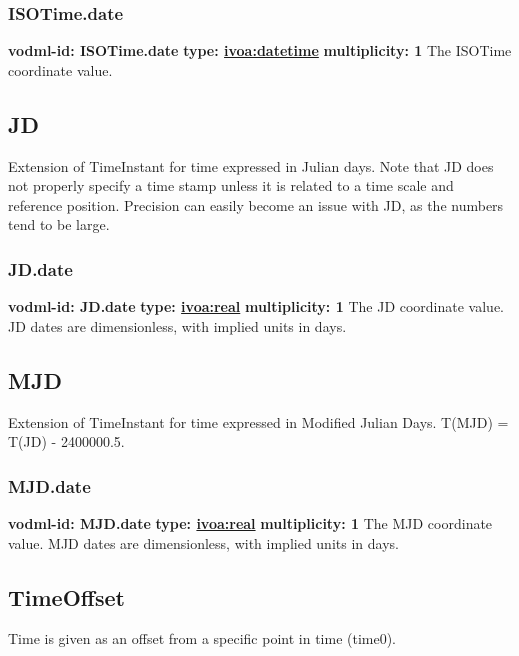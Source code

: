     \subsubsection{ISOTime.date}
      \textbf{vodml-id: ISOTime.date} \newline
      \textbf{type: \hyperref[sect:ivoa]{ivoa:datetime}} \newline
      \textbf{multiplicity: 1} \newline 
      The ISOTime coordinate value.

  \subsection{JD}
  \label{sect:JD}
    Extension of TimeInstant for time expressed in Julian days. Note that JD does not properly specify a time stamp unless it is related to a time scale and reference position. Precision can easily become an issue with JD, as the numbers tend to be large.

    \subsubsection{JD.date}
      \textbf{vodml-id: JD.date} \newline
      \textbf{type: \hyperref[sect:ivoa]{ivoa:real}} \newline
      \textbf{multiplicity: 1} \newline 
      The JD coordinate value. JD dates are dimensionless, with implied units in days.

  \subsection{MJD}
  \label{sect:MJD}
    Extension of TimeInstant for time expressed in Modified Julian Days. T(MJD) = T(JD) - 2400000.5.

    \subsubsection{MJD.date}
      \textbf{vodml-id: MJD.date} \newline
      \textbf{type: \hyperref[sect:ivoa]{ivoa:real}} \newline
      \textbf{multiplicity: 1} \newline 
      The MJD coordinate value. MJD dates are dimensionless, with implied units in days.

  \subsection{TimeOffset}
  \label{sect:TimeOffset}
    Time is given as an offset from a specific point in time (time0).

